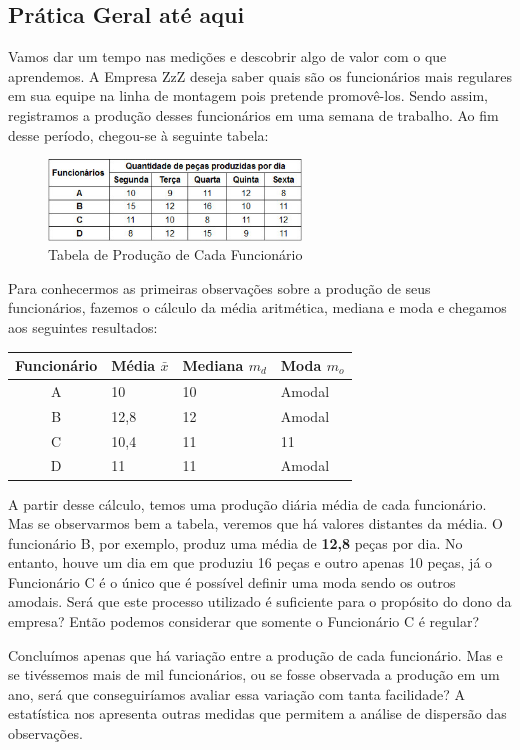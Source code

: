 \documentclass[a4paper,11pt]{article}
\begin{document}
\subsection{Prática Geral até aqui}
Vamos dar um tempo nas medições e descobrir algo de valor com o que aprendemos. A Empresa ZzZ deseja saber quais são os funcionários mais regulares em sua equipe na linha de montagem pois pretende promovê-los. Sendo assim, registramos a produção desses funcionários em uma semana de trabalho. Ao fim desse período, chegou-se à seguinte tabela:
\begin{figure}[H]
	\centering
	\includegraphics[width=0.6\textwidth]{imagens/tabelaFunc.jpg}
	\caption{Tabela de Produção de Cada Funcionário}
\end{figure}

Para conhecermos as primeiras observações sobre a produção de seus funcionários, fazemos o cálculo da média aritmética, mediana e moda e chegamos aos seguintes resultados:
\begin{table}[H]
	\centering 
	\begin{tabular}{c|l|l|l}
		\textbf{Funcionário} & \textbf{Média $\bar{x}$} & \textbf{Mediana $m_{d}$} & \textbf{Moda $m_{o}$} \\ \hline
		A & 10 & 10 & Amodal  \\ \hline
		B & 12,8 & 12 & Amodal \\ \hline
		C & 10,4 & 11 & 11 \\ \hline
		D & 11 & 11 & Amodal
	\end{tabular}
\end{table}

A partir desse cálculo, temos uma produção diária média de cada funcionário. Mas se observarmos bem a tabela, veremos que há valores distantes da média. O funcionário B, por exemplo, produz uma média de \textbf{12,8} peças por dia. No entanto, houve um dia em que produziu 16 peças e outro apenas 10 peças, já o Funcionário C é o único que é possível definir uma moda sendo os outros amodais. Será que este processo utilizado é suficiente para o propósito do dono da empresa? Então podemos considerar que somente o Funcionário C é regular?

Concluímos apenas que há variação entre a produção de cada funcionário. Mas e se tivéssemos mais de mil funcionários, ou se fosse observada a produção em um ano, será que conseguiríamos avaliar essa variação com tanta facilidade? A estatística nos apresenta outras medidas que permitem a análise de dispersão das observações. 
\end{document}
